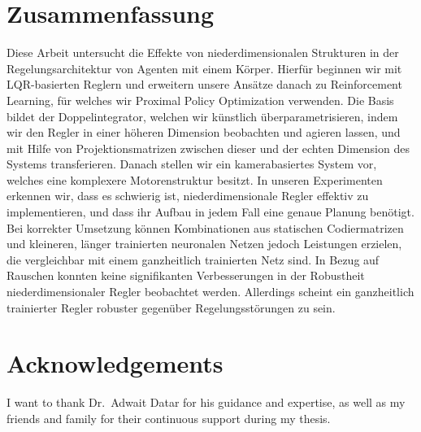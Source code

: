 \documentclass[12pt,final,twoside]{report}
\theoremstyle{plain}
\theoremstyle{definition}
\theoremstyle{remark}
\begin{document}
\section*{Zusammenfassung}
\label{sec:zusammenfassung}
Diese Arbeit untersucht die Effekte von niederdimensionalen Strukturen in der Regelungsarchitektur von
Agenten mit einem Körper. Hierfür beginnen wir mit LQR-basierten Reglern und erweitern unsere Ansätze
danach zu Reinforcement Learning, für welches wir Proximal Policy Optimization verwenden. Die Basis
bildet der Doppelintegrator, welchen wir künstlich überparametrisieren, indem wir den Regler in einer
höheren Dimension beobachten und agieren lassen, und mit Hilfe von Projektionsmatrizen zwischen dieser
und der echten Dimension des Systems transferieren. Danach stellen wir ein kamerabasiertes System vor,
welches eine komplexere Motorenstruktur besitzt. In unseren Experimenten erkennen wir, dass es schwierig
ist, niederdimensionale Regler effektiv zu implementieren, und dass ihr Aufbau in jedem Fall eine genaue Planung
benötigt. Bei korrekter Umsetzung können Kombinationen aus statischen Codiermatrizen und kleineren,
länger trainierten neuronalen Netzen jedoch Leistungen erzielen, die vergleichbar mit einem ganzheitlich trainierten
Netz sind. In Bezug auf Rauschen konnten keine signifikanten Verbesserungen in der Robustheit niederdimensionaler Regler
beobachtet werden. Allerdings scheint ein ganzheitlich trainierter Regler robuster
gegenüber Regelungsstörungen zu sein.

\cleardoublepage

\section*{Acknowledgements}
\label{sec:acknowledgements}
I want to thank Dr.~Adwait Datar for his guidance and expertise, as well as my friends and family for their
continuous support during my thesis.

\cleardoublepage

\tableofcontents
\cleardoublepage
\listoffigures
\cleardoublepage
{}
\listoftables
\cleardoublepage
\end{document}
